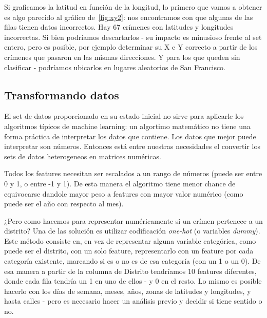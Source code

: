 Si graficamos la latitud en función de la longitud, lo primero que vamos a obtener es algo parecido al gráfico de~\ref{fig:xy2}: nos encontramos con que algunas de las filas tienen datos incorrectos. Hay 67 crímenes con latitudes y longitudes incorrectas. Si bien podríamos descartarlos - su impacto es minusioso frente al set entero, pero es posible, por ejemplo determinar su X e Y correcto a partir de los crímenes que pasaron en las mismas direcciones. Y para los que queden sin clasificar - podríamos ubicarlos en lugares aleatorios de San Francisco.



\subsection{Transformando datos} %
\label{sub:transformando_datos}

El set de datos proporcionado en su estado inicial no sirve para aplicarle los algoritmos típicos de machine learning: un algortimo matemático no tiene una forma práctica de interpretar los datos que contiene. Los datos que mejor puede interpretar son números. Entonces está entre nuestras necesidades el convertir los sets de datos heterogeneos en matrices numéricas.

Todos los features necesitan ser escalados a un rango de números (puede ser entre 0 y 1, o entre -1 y 1). De esta manera el algoritmo tiene menor chance de equivocarse dandole mayor peso a features con mayor valor numérico (como puede ser el año con respecto al mes).

¿Pero como hacemos para representar numéricamente si un crímen pertenece a un distrito? Una de las solución es utilizar codificación \textit{one-hot} (o variables \textit{dummy}). Este método consiste en, en vez de representar alguna variable categórica, como puede ser el distrito, con un solo feature, representarlo con un feature por cada categoría existente, marcando si es o no es de esa categoría (con un 1 o un 0). De esa manera a partir de la columna de Distrito tendríamos 10 features diferentes, donde cada fila tendría un 1 en uno de ellos - y 0 en el resto. Lo mismo es posible hacerlo con los días de semana, meses, años, zonas de latitudes y longitudes, y hasta calles - pero es necesario hacer un análisis previo y decidir si tiene sentido o no.


